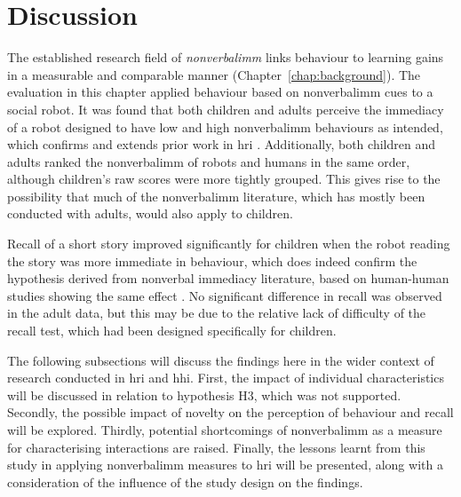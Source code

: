 \section{Discussion} \label{sec:nvi-discussion}
The established research field of \textit{\gls{nonverbalimm}} links behaviour to learning gains in a measurable and comparable manner (Chapter~\ref{chap:background}). The evaluation in this chapter applied behaviour based on \gls{nonverbalimm} cues to a social robot. It was found that both children and adults perceive the immediacy of a robot designed to have low and high \gls{nonverbalimm} behaviours as intended, which confirms and extends prior work in \acrshort{hri} \citep{szafir2012pay}. Additionally, both children and adults ranked the \gls{nonverbalimm} of robots and humans in the same order, although children's raw scores were more tightly grouped. This gives rise to the possibility that much of the \gls{nonverbalimm} literature, which has mostly been conducted with adults, would also apply to children.

Recall of a short story improved significantly for children when the robot reading the story was more immediate in behaviour, which does indeed confirm the hypothesis derived from nonverbal immediacy literature, based on human-human studies showing the same effect \citep{goodboy2009effects, witt2001experimental}. No significant difference in recall was observed in the adult data, but this may be due to the relative lack of difficulty of the recall test, which had been designed specifically for children.

The following subsections will discuss the findings here in the wider context of research conducted in \acrshort{hri} and \acrshort{hhi}. First, the impact of individual characteristics will be discussed in relation to hypothesis H3, which was not supported. Secondly, the possible impact of novelty on the perception of behaviour and recall will be explored. Thirdly, potential shortcomings of \gls{nonverbalimm} as a measure for characterising interactions are raised. Finally, the lessons learnt from this study in applying \gls{nonverbalimm} measures to \acrshort{hri} will be presented, along with a consideration of the influence of the study design on the findings.

